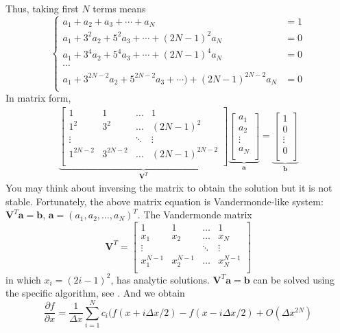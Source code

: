 Thus, taking first $N$ terms means
\begin{equation}
\left\{
\begin{split}
a_1+a_2+a_3+\cdots+a_N&=1\\
a_1+3^2a_2+5^2a_3+\cdots+(2N-1)^2a_N&=0\\
a_1+3^4a_2+5^4a_3+\cdots+(2N-1)^4a_N&=0\\
\cdots	&\\
a_1+3^{2N-2}a_2+5^{2N-2}a_3+\cdots)+(2N-1)^{2N-2}a_N&=0\\
\end{split}
\right.
\end{equation}
In matrix form,
\begin{gather}
\underbrace{
\begin{bmatrix}
	1 & 1 & \ldots & 1\\
	1^2 & 3^2 & \ldots & (2N-1)^2\\
	\vdots & 	&	\ddots	& \vdots	\\
	1^{2N-2} & 3^{2N-2} & \ldots & (2N-1)^{2N-2}\\
\end{bmatrix}
}_{\textbf{V}^T}
\underbrace{
\begin{bmatrix}
a_1\\
a_2\\
\vdots\\
a_N\\
\end{bmatrix}
}_{\textbf{a}}=
\underbrace{
\begin{bmatrix}
1\\
0\\
\vdots\\
0\\
\end{bmatrix}
}_{\textbf{b}}
\end{gather}
You may think about inversing the matrix to obtain the solution but it is not stable. Fortunately, the above matrix equation is Vandermonde-like system: $\textbf{V}^T\textbf{a}=\textbf{b}$, $\textbf{a}=(a_1, a_2,\ldots, a_N)^T$. The Vandermonde matrix
\begin{equation}
\textbf{V}^T=
\begin{bmatrix}
1 & 1 & \ldots & 1\\
x_1 & x_2 & \ldots & x_{N}\\
\vdots &  & \ddots & \vdots\\
x_1^{N-1} & x_2^{N-1} & \ldots & x_N^{N-1}\\
\end{bmatrix}
\end{equation}
in which $x_i=(2i-1)^2$, has analytic solutions. $\textbf{V}^T\textbf{a}=\textbf{b}$ can be solved using the specific algorithm, see \cite{bjorck1996numerical}. And we obtain
\begin{equation}
\frac{\partial f}{\partial x}=\frac{1}{\Delta x}\sum_{i=1}^N c_i(f(x+i\Delta x/2)-f(x-i\Delta x/2)+O(\Delta x^{2N})
\end{equation}

